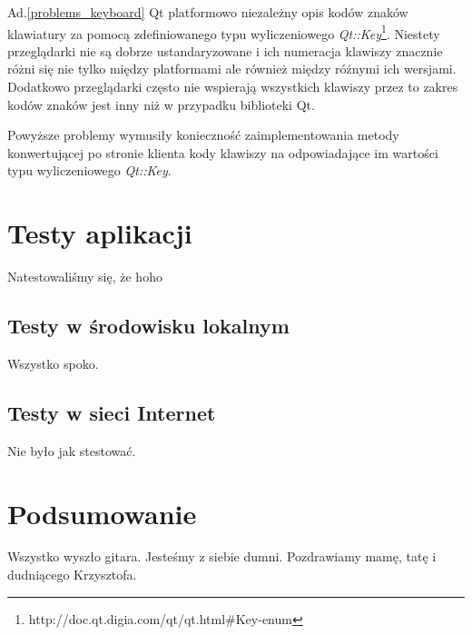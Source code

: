\documentclass[polish]{inz}
\begin{document}
Ad.\ref{problems_keyboard} 
Qt platformowo niezależny opis kodów znaków klawiatury za pomocą zdefiniowanego typu wyliczeniowego \emph{Qt::Key}\footnote{http://doc.qt.digia.com/qt/qt.html\#Key-enum}. Niestety przeglądarki nie są dobrze ustandaryzowane i ich numeracja klawiszy znacznie różni się nie tylko między platformami ale również między różnymi ich wersjami. Dodatkowo przeglądarki często nie wspierają wszystkich klawiszy przez to zakres kodów znaków jest inny niż w przypadku biblioteki Qt.

Powyższe problemy wymusiły konieczność zaimplementowania metody konwertującej po stronie klienta kody klawiszy na odpowiadające im wartości typu wyliczeniowego \emph{Qt::Key}.

\chapter{Testy aplikacji}
Natestowaliśmy się, że hoho

\section{Testy w środowisku lokalnym}
Wszystko spoko.

\section{Testy w sieci Internet}
Nie było jak stestować.

\chapter{Podsumowanie}
Wszystko wyszło gitara. Jesteśmy z siebie dumni. Pozdrawiamy mamę, tatę i dudniącego Krzysztofa.

\printindex
\end{document}

